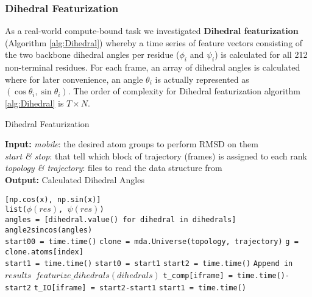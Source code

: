 \subsubsection{Dihedral Featurization}
As a real-world compute-bound task we investigated \textbf{Dihedral featurization} \citep{Sittel:2014aa} (Algorithm \ref{alg:Dihedral}) whereby a time series of
feature vectors consisting of the two backbone dihedral angles per residue ($\phi_{i}$ and $\psi_{i}$) is calculated for all 212
non-terminal residues. For each frame, an array of dihedral angles is calculated where for later convenience, an angle $\theta_{i}$ is
actually represented as $(\cos\theta_{i}, \sin\theta_{i})$. 
The order of complexity for Dihedral featurization algorithm \ref{alg:Dihedral} is $T \times N$. 

\begin{algorithm}[t]
	\scriptsize
    \caption{Dihedral Featurization}
    \label{alg:Dihedral}
    \hspace*{\algorithmicindent} \textbf{Input:} \emph{mobile}: the desired atom groups to perform RMSD on them \\ 
    \hspace*{\algorithmicindent} \emph{start \& stop}: that tell which block of trajectory (frames) is assigned to each rank \\
    \hspace*{\algorithmicindent} \emph{topology \& trajectory}: files to read the data structure from \\
    \hspace*{\algorithmicindent} \textbf{Output:} Calculated Dihedral Angles
    \begin{algorithmic}[1]
        \State \Return \texttt{[np.cos(x), np.sin(x)]}
        \EndProcedure
        \\
        \State \texttt{list($\phi (res)$, $\psi (res)$)}
        \EndFor
        \EndProcedure
        \\
        \State \texttt{angles = [dihedral.value() for dihedral in dihedrals]}
        \State \Return \texttt{angle2sincos(angles)}
        \EndProcedure
        \\
        \State \texttt{start00 = time.time()}
        \State \texttt{clone = mda.Universe(topology, trajectory)}
        \State \texttt{g = clone.atoms[index]}
        \\
        \State \texttt{start1 = time.time()}
        \State \texttt{start0 = start1}
        \State \texttt{start2 = time.time()}
        \State \texttt{Append in $results$ $featurize\_dihedrals(dihedrals)$}
        \State \texttt{t\_comp[iframe] = time.time()-start2}
        \State \texttt{t\_IO[iframe] = start2-start1}
        \State \texttt{start1 = time.time()}
        \EndFor
        

\end{algorithmic}
\end{algorithm}
